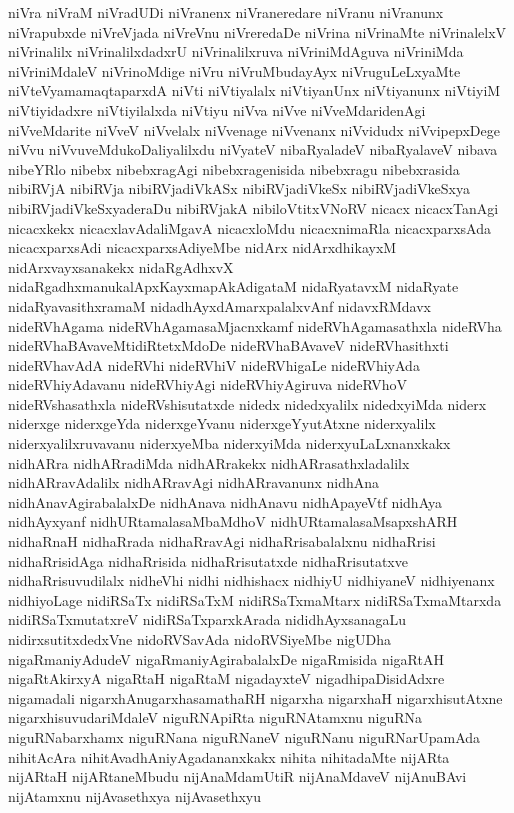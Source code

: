 {niVra
niVraM
niVradUDi
niVranenx
niVraneredare
niVranu
niVranunx
niVrapubxde
niVreVjada
niVreVnu
niVreredaDe
niVrina
niVrinaMte
niVrinalelxV
niVrinalilx
niVrinalilxdadxrU
niVrinalilxruva
niVriniMdAguva
niVriniMda
niVriniMdaleV
niVrinoMdige
niVru
niVruMbudayAyx
niVruguLeLxyaMte
niVteVyamamaqtaparxdA
niVti
niVtiyalalx
niVtiyanUnx
niVtiyanunx
niVtiyiM
niVtiyidadxre
niVtiyilalxda
niVtiyu
niVva
niVve
niVveMdaridenAgi
niVveMdarite
niVveV
niVvelalx
niVvenage
niVvenanx
niVvidudx
niVvipepxDege
niVvu
niVvuveMdukoDaliyalilxdu
niVyateV
nibaRyaladeV
nibaRyalaveV
nibava
nibeYRlo
nibebx
nibebxragAgi
nibebxragenisida
nibebxragu
nibebxrasida
nibiRVjA
nibiRVja
nibiRVjadiVkASx
nibiRVjadiVkeSx
nibiRVjadiVkeSxya
nibiRVjadiVkeSxyaderaDu
nibiRVjakA
nibiloVtitxVNoRV
nicacx
nicacxTanAgi
nicacxkekx
nicacxlavAdaliMgavA
nicacxloMdu
nicacxnimaRla
nicacxparxsAda
nicacxparxsAdi
nicacxparxsAdiyeMbe
nidArx
nidArxdhikayxM
nidArxvayxsanakekx
nidaRgAdhxvX
nidaRgadhxmanukalApxKayxmapAkAdigataM
nidaRyatavxM
nidaRyate
nidaRyavasithxramaM
nidadhAyxdAmarxpalalxvAnf
nidavxRMdavx
nideRVhAgama
nideRVhAgamasaMjacnxkamf
nideRVhAgamasathxla
nideRVha
nideRVhaBAvaveMtidiRtetxMdoDe
nideRVhaBAvaveV
nideRVhasithxti
nideRVhavAdA
nideRVhi
nideRVhiV
nideRVhigaLe
nideRVhiyAda
nideRVhiyAdavanu
nideRVhiyAgi
nideRVhiyAgiruva
nideRVhoV
nideRVshasathxla
nideRVshisutatxde
nidedx
nidedxyalilx
nidedxyiMda
niderx
niderxge
niderxgeYda
niderxgeYvanu
niderxgeYyutAtxne
niderxyalilx
niderxyalilxruvavanu
niderxyeMba
niderxyiMda
niderxyuLaLxnanxkakx
nidhARra
nidhARradiMda
nidhARrakekx
nidhARrasathxladalilx
nidhARravAdalilx
nidhARravAgi
nidhARravanunx
nidhAna
nidhAnavAgirabalalxDe
nidhAnava
nidhAnavu
nidhApayeVtf
nidhAya
nidhAyxyanf
nidhURtamalasaMbaMdhoV
nidhURtamalasaMsapxshARH
nidhaRnaH
nidhaRrada
nidhaRravAgi
nidhaRrisabalalxnu
nidhaRrisi
nidhaRrisidAga
nidhaRrisida
nidhaRrisutatxde
nidhaRrisutatxve
nidhaRrisuvudilalx
nidheVhi
nidhi
nidhishacx
nidhiyU
nidhiyaneV
nidhiyenanx
nidhiyoLage
nidiRSaTx
nidiRSaTxM
nidiRSaTxmaMtarx
nidiRSaTxmaMtarxda
nidiRSaTxmutatxreV
nidiRSaTxparxkArada
nididhAyxsanagaLu
nidirxsutitxdedxVne
nidoRVSavAda
nidoRVSiyeMbe
nigUDha
nigaRmaniyAdudeV
nigaRmaniyAgirabalalxDe
nigaRmisida
nigaRtAH
nigaRtAkirxyA
nigaRtaH
nigaRtaM
nigadayxteV
nigadhipaDisidAdxre
nigamadali
nigarxhAnugarxhasamathaRH
nigarxha
nigarxhaH
nigarxhisutAtxne
nigarxhisuvudariMdaleV
niguRNApiRta
niguRNAtamxnu
niguRNa
niguRNabarxhamx
niguRNana
niguRNaneV
niguRNanu
niguRNarUpamAda
nihitAcAra
nihitAvadhAniyAgadananxkakx
nihita
nihitadaMte
nijARta
nijARtaH
nijARtaneMbudu
nijAnaMdamUtiR
nijAnaMdaveV
nijAnuBAvi
nijAtamxnu
nijAvasethxya
nijAvasethxyu
}
